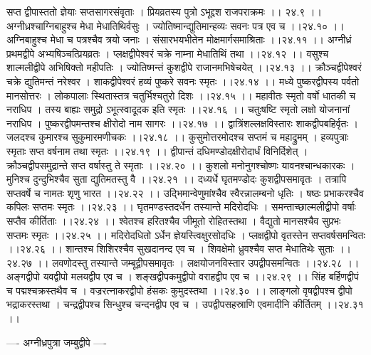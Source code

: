 \documentclass[11pt]{book}
\begin{document}
\begin{landscape}
सप्त द्वीपास्ततो ज्ञेयाः सप्तसागरसंवृताः ।
प्रियव्रतस्य पुत्रो ऽभूद्दश राजपराक्रमः ।। २४.९ ।।
अग्नीध्रश्चाग्निबाहुश्च मेधा मेधातिथिर्वसुः ।
ज्योतिष्मान्द्युतिमान्हव्यः सवनः पत्र एव च ।।२४.१० ।।
अग्निबाहुश्च मेधा च पत्रश्चैव त्रयो जनाः ।
संसारभयभीतेन मोक्षमार्गसमाश्रिताः ।।२४.११ ।।
अग्नीध्रं प्रथमद्वीपे अभ्यषिञ्चत्प्रियव्रतः ।
प्लक्षद्वीपेश्वरं चक्रे नाम्ना मेधातिथिं तथा ।।२४.१२ ।।
वसुश्च शाल्मलीद्वीपे अभिषिक्तो महीपतिः ।
ज्योतिष्मन्तं कुशद्वीपे राजानमभिषेचयेत् ।।२४.१३ ।।
क्रौञ्चद्वीपेश्वरं चक्रे द्युतिमन्तं नरेश्वर ।
शाकद्वीपेश्वरं हव्यं पुष्करे सवनः स्मृतः ।।२४.१४ ।।
मध्ये पुष्करद्वीपस्य पर्वतो मानसोत्तरः ।
लोकपालाः स्थितास्तत्र चतुर्भिश्चतुरो दिशः ।।२४.१५ ।।
महावीतः स्मृतो वर्षो धातकी च नराधिप ।
तस्य बाह्यः समुद्रो ऽभूत्स्वादूदक इति स्मृतः ।।२४.१६ ।।
चतुःषष्टि स्मृतो लक्षो योजनानां नराधिप ।
पुष्करद्वीपमन्तश्च क्षीरोदो नाम सागरः ।।२४.१७ ।।
द्वात्रिंशल्लक्षविस्तारः शाकद्वीपबहिर्वृतः ।
जलदश्च कुमारश्च सुकुमारमणीचकः ।।२४.१८ ।।
कुसुमोत्तरमोदश्च सप्तमं च महाद्रुमम् ।
हव्यपुत्राः स्मृताः सप्त वर्षनाम तथा स्मृतः ।।२४.१९ ।।
द्वीपान्तं दधिमण्डोदक्षीरोदार्धं विनिर्दिशेत् ।
क्रौञ्चद्वीपसमुद्रान्ते सप्त वर्षास्तु ते स्मृताः ।।२४.२० ।।
कुशलो मनोनुगश्चोष्णः यावनश्चान्धकारकः ।
मुनिश्च दुन्दुभिश्चैव सुता द्युतिमतस्तु वै ।।२४.२१ ।।
दध्यर्धे घृतमण्डोदः कुशद्वीपसमावृतः ।
तत्रापि सप्तवर्षे च नामतः शृणु भारत ।।२४.२२ ।।
उद्भिमान्वेणुमांश्चैव स्वैरन्नालम्बनो धृतिः ।
षष्ठः प्रभाकरश्चैव कपिलः सप्तमः स्मृतः ।।२४.२३ ।।
घृतमण्डस्तदर्धेन तस्यान्ते मदिरोदधिः ।
समन्ताच्छाल्मलीद्वीपो वर्षाः सप्तैव कीर्तिताः ।।२४.२४ ।।
श्वेतश्च हरितश्चैव जीमूतो रोहितस्तथा ।
वैद्युतो मानसश्चैव सुप्रभः सप्तमः स्मृतः ।।२४.२५ ।।
मदिरोदधितो ऽर्धेन ज्ञेयस्त्विक्षुरसोदधिः ।
प्लक्षद्वीपो वृतस्तेन सप्तवर्षसमन्वितः ।।२४.२६ ।।
शान्तश्च शिशिरश्चैव सुखदानन्द एव च ।
शिवक्षेमो ध्रुवश्चैव सप्त मेधातिथेः सुताः ।।२४.२७ ।।
लवणोदस्तु तस्यान्ते जम्बूद्वीपसमावृतः ।
लक्षयोजनविस्तार उपद्वीपसमन्वितः ।।२४.२८ ।।
अङ्गद्वीपो यवद्वीपो मलयद्वीप एव च ।
शङ्खद्वीपकमुद्वीपो वराहद्वीप एव च ।।२४.२९ ।।
सिंह बर्हिणद्वीपं च पद्मश्चक्रस्तथैव च ।
वज्ररत्नाकरद्वीपो हंसकः कुमुदस्तथा ।।२४.३० ।।
लाङ्गलो वृषद्वीपश्च द्वीपो भद्राकरस्तथा ।
चन्द्रद्वीपश्च सिन्धुश्च चन्दनद्वीप एव च ।
उपद्वीपसहस्राणि एवमादीनि कीर्तितम् ।।२४.३१ ।।

---- अग्नीध्रपुत्रा जम्बुद्वीपे ----


\end{landscape}
\end{document}
